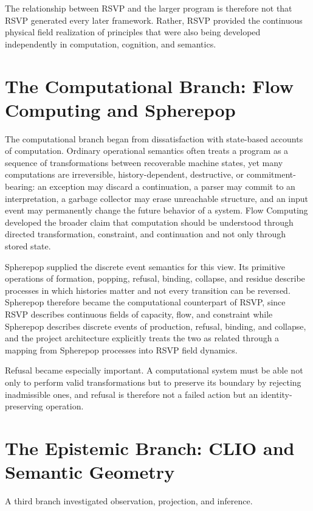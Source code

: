 \documentclass[11pt,oneside]{book}
\numberwithin{equation}{chapter}
\theoremstyle{definition}
\theoremstyle{plain}
\begin{document}
The relationship between RSVP and the larger program is therefore not that
RSVP generated every later framework. Rather, RSVP provided the continuous
physical field realization of principles that were also being developed
independently in computation, cognition, and semantics.

\section{The Computational Branch: Flow Computing and Spherepop}

The computational branch began from dissatisfaction with state-based accounts of computation. Ordinary operational semantics often treats a program as a sequence of transformations between recoverable machine states, yet many computations are irreversible, history-dependent, destructive, or commitment-bearing: an exception may discard a continuation, a parser may commit to an interpretation, a garbage collector may erase unreachable structure, and an input event may permanently change the future behavior of a system. Flow Computing developed the broader claim that computation should be understood through directed transformation, constraint, and continuation and not only through stored state.

Spherepop supplied the discrete event semantics for this view. Its primitive operations of formation, popping, refusal, binding, collapse, and residue describe processes in which histories matter and not every transition can be reversed. Spherepop therefore became the computational counterpart of RSVP, since RSVP describes continuous fields of capacity, flow, and constraint while Spherepop describes discrete events of production, refusal, binding, and collapse, and the project architecture explicitly treats the two as related through a mapping from Spherepop processes into RSVP field dynamics.

Refusal became especially important. A computational system must be able not only to perform valid transformations but to preserve its boundary by rejecting inadmissible ones, and refusal is therefore not a failed action but an identity-preserving operation.

\section{The Epistemic Branch: CLIO and Semantic Geometry}

A third branch investigated observation, projection, and inference.
\end{document}
